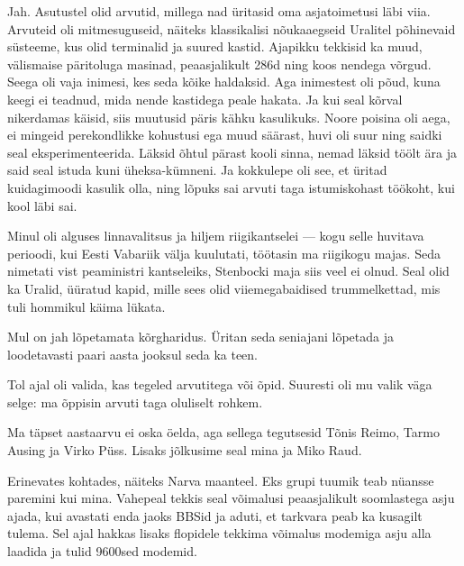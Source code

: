 
Jah. Asutustel olid arvutid, millega nad üritasid oma asjatoimetusi läbi viia.
Arvuteid oli mitmesuguseid, näiteks klassikalisi nõukaaegseid Uralitel 
põhinevaid süsteeme, kus olid terminalid ja suured kastid.
Ajapikku tekkisid ka muud, välismaise päritoluga masinad, peaasjalikult 
286d ning koos nendega võrgud. Seega oli vaja 
inimesi, kes seda kõike haldaksid. Aga inimestest oli põud, kuna 
keegi ei teadnud, mida nende kastidega peale hakata. Ja kui seal kõrval 
nikerdamas käisid, siis muutusid päris kähku kasulikuks. Noore poisina oli 
aega, ei mingeid perekondlikke kohustusi ega muud säärast, huvi oli suur ning 
saidki seal eksperimenteerida. Läksid õhtul pärast kooli sinna, nemad läksid 
töölt ära ja said seal istuda kuni üheksa-kümneni. Ja kokkulepe oli see, et üritad kuidagimoodi kasulik olla, ning 
lõpuks sai arvuti taga istumiskohast töökoht, kui kool läbi sai.


Minul oli alguses linnavalitsus ja hiljem 
riigikantselei --- kogu selle 
huvitava perioodi, kui Eesti Vabariik välja kuulutati, töötasin ma
riigikogu majas. Seda nimetati 
vist peaministri kantseleiks, Stenbocki maja siis veel ei olnud. Seal olid ka 
Uralid, 
üüratud kapid, mille sees olid viiemegabaidised trummelkettad, mis tuli 
hommikul käima lükata.


Mul on jah lõpetamata kõrgharidus. 
Üritan seda seniajani lõpetada ja loodetavasti paari aasta 
jooksul seda ka teen.

Tol ajal oli valida, kas tegeled arvutitega või õpid. Suuresti oli mu valik 
väga selge: ma õppisin arvuti taga oluliselt rohkem.


Ma täpset aastaarvu ei oska öelda, aga sellega tegutsesid 
Tõnis Reimo, Tarmo 
Ausing ja Virko Püss. Lisaks
jõlkusime seal mina ja Miko Raud.


Erinevates kohtades, näiteks Narva maanteel. Eks grupi tuumik 
teab nüansse paremini kui mina. Vahepeal tekkis seal 
võimalusi peaasjalikult soomlastega asju ajada, kui avastati enda jaoks BBSid ja aduti, et tarkvara peab ka kusagilt tulema. Sel ajal
hakkas lisaks flopidele tekkima võimalus modemiga asju alla laadida ja tulid 9600sed modemid.

